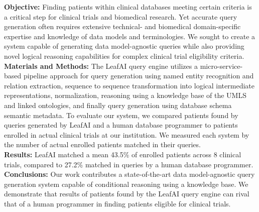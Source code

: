 \documentclass[../main.tex]{subfiles}
\begin{document}
\noindent\textbf{Objective:} Finding patients within clinical databases meeting certain criteria is a critical step for clinical trials and biomedical research. Yet accurate query generation often requires extensive technical- and biomedical domain-specific expertise and knowledge of data models and terminologies. We sought to create a system capable of generating data model-agnostic queries while also providing novel logical reasoning capabilities for complex clinical trial eligibility criteria. \\

\noindent\textbf{Materials and Methods:} The LeafAI query engine utilizes a micro-service-based pipeline approach for query generation using named entity recognition and relation extraction, sequence to sequence transformation into logical intermediate representations, normalization, reasoning using a knowledge base of the UMLS and linked ontologies, and finally query generation using database schema semantic metadata. To evaluate our system, we compared patients found by queries generated by LeafAI and a human database programmer to patients enrolled in actual clinical trials at our institution. We measured each system by the number of actual enrolled patients matched in their queries. \\

\noindent\textbf{Results:} LeafAI matched a mean 43.5\% of enrolled patients across 8 clinical trials, compared to 27.2\% matched in queries by a human database programmer. \\

\noindent\textbf{Conclusions:} Our work contributes a state-of-the-art data model-agnostic query generation system capable of conditional reasoning using a knowledge base. We demonstrate that results of patients found by the LeafAI query engine can rival that of a human programmer in finding patients eligible for clinical trials.
\end{document}
